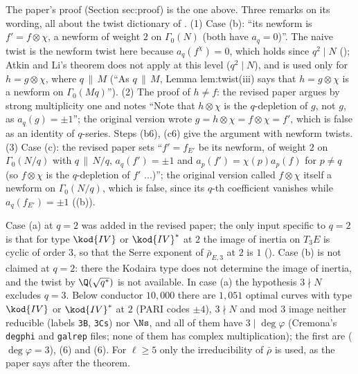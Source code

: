 \begin{paperlink}
The paper's proof (Section sec:proof) is the one above. Three remarks on its wording, all about the twist dictionary of
. (1) Case (b): ``its newform is $f'=f\otimes\chi$, a newform of weight $2$ on $\Gamma_0(N)$ (both have $a_q=0$)''. The naive twist is the newform
twist here because $a_q(f^\chi)=0$, which holds since $q^2\mid N$ (); Atkin and Li's theorem does not apply at this level ($q^2\mid N$), and is
used only for $h=g\otimes\chi$, where $q\,\|\,M$ (``As $q\,\|\,M$, Lemma lem:twist(iii) says that $h=g\otimes\chi$ is a newform on $\Gamma_0(Mq)$''). (2) The proof of $h\ne f$: the
revised paper argues by strong multiplicity one and notes ``Note that $h\otimes\chi$ is the $q$-depletion of $g$, not $g$, as $a_q(g)=\pm1$''; the original version wrote
$g=h\otimes\chi=f\otimes\chi=f'$, which is false as an identity of $q$-series. Steps (b6), (c6) give the argument with newform twists. (3) Case (c): the revised paper sets
``$f'=f_{E'}$ be its newform, of weight $2$ on $\Gamma_0(N/q)$ with $q\,\|\,N/q$, $a_q(f')=\pm1$ and $a_p(f')=\chi(p)a_p(f)$ for $p\ne q$ (so $f\otimes\chi$ is the $q$-depletion of $f'$ ...)''; the
original version called $f\otimes\chi$ itself a newform on $\Gamma_0(N/q)$, which is false, since its $q$-th coefficient vanishes while $a_q(f_{E'})=\pm1$
((b)).
\end{paperlink}

\begin{remark}[case (a) at $q=2$, and the range of the hypotheses]\label{rem:modgalrep:qual-q2}
Case (a) at $q=2$ was added in the revised paper; the only input specific to $q=2$ is that for type $\kod{IV}$ or $\kod{IV}^*$ at $2$ the image of inertia on $T_3E$ is
cyclic of order $3$, so that the Serre exponent of $\bar\rho_{E,3}$ at $2$ is $1$ (). Case (b) is not claimed at $q=2$: there the Kodaira type does not
determine the image of inertia, and the twist by $\Q(\sqrt{q^*})$ is not available. In case (a) the hypothesis $3\nmid N$ excludes $q=3$. Below conductor $10{,}000$ there
are $1{,}051$ optimal curves with type $\kod{IV}$ or $\kod{IV}^*$ at $2$ (PARI codes $\pm4$), $3\nmid N$ and mod $3$ image neither reducible (labels \texttt{3B}, \texttt{3Cs}) nor $\Ns$, and
all of them have $3\mid\deg\varphi$ (Cremona's \texttt{degphi} and \texttt{galrep} files; none of them has complex multiplication); the first are  ($\deg\varphi=3$),
 ($6$) and  ($6$). For $\ell\ge5$ only the irreducibility of $\bar\rho$ is used, as the paper says after the theorem.
\end{remark}


